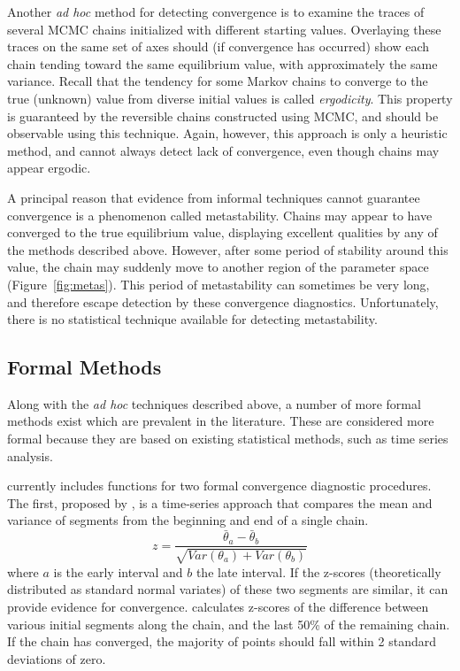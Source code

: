 \documentclass[]{jss}
\begin{document}
Another \emph{ad hoc} method for detecting convergence is to examine the traces of several MCMC chains initialized with different starting values. Overlaying these traces on the same set of axes should (if convergence has occurred) show each chain tending toward the same equilibrium value, with approximately the same variance. Recall that the tendency for some Markov chains to converge to the true (unknown) value from diverse initial values is called \emph{ergodicity}. This property is guaranteed by the reversible chains constructed using MCMC, and should be observable using this technique. Again, however, this approach is only a heuristic method, and cannot always detect lack of convergence, even though chains may appear ergodic.

A principal reason that evidence from informal techniques cannot guarantee convergence is a phenomenon called metastability. Chains may appear to have converged to the true equilibrium value, displaying excellent qualities by any of the methods described above. However, after some period of stability around this value, the chain may suddenly move to another region of the parameter space (Figure~\ref{fig:metas}). This period of metastability can sometimes be very long, and therefore escape detection by these convergence diagnostics. Unfortunately, there is no statistical technique available for detecting metastability.

\subsection{Formal Methods}

Along with the \emph{ad hoc} techniques described above, a number of more formal methods exist which are prevalent in the literature. These are considered more formal because they are based on existing statistical methods, such as time series analysis.

 currently includes functions for two formal convergence diagnostic procedures. The first, proposed by \citet{Geweke:1992gm}, is a time-series approach that compares the mean and variance of segments from the beginning and end of a single chain.
\begin{equation}
z = \frac{\bar{\theta}_a - \bar{\theta}_b}{\sqrt{Var(\theta_a) + Var(\theta_b)}}
\end{equation}
where $a$ is the early interval and $b$ the late interval. If the z-scores (theoretically distributed as standard normal variates) of these two segments are similar, it can provide evidence for convergence.  calculates z-scores of the difference between various initial segments along the chain, and the last 50\% of the remaining chain. If the chain has converged, the majority of points should fall within 2 standard deviations of zero.
\end{document}
